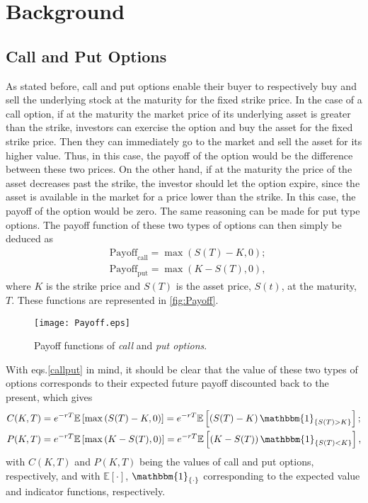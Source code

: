 \chapter{Background}
\label{chapter:background}
\section{Call and Put Options}
As stated before, call and put options enable their buyer to respectively buy and sell the underlying stock at the maturity for the fixed strike price.
In the case of a call option, if at the maturity the market price of its underlying asset is greater than the strike, investors can exercise the option and buy the asset for the fixed strike price. Then they can immediately go to the market and sell the asset for its higher value. Thus, in this case, the payoff of the option would be the difference between these two prices. On the other hand, if at the maturity the price of the asset decreases past the strike, the investor should let the option expire, since the asset is available in the market for a price lower than the strike. In this case, the payoff of the option would be zero.
The same reasoning can be made for put type options.
The payoff function of these two types of options can then simply be deduced as
\begin{equation}\label{callput}
\begin{split}
&\text{Payoff}_\text{call}=\max\left(S(T)-K,0\right);\\
&\text{Payoff}_\text{put}=\max\left(K-S(T),0\right),
\end{split}
\end{equation}
\noindent where $K$ is the strike price and $S(T)$ is the asset price, $S(t)$, at the maturity, $T$. These functions are represented in \autoref{fig:Payoff}.

\begin{figure}[!htb]
    \centering
      \texttt{[image: Payoff.eps]}
      \caption[Payoff functions of call and put options]{Payoff functions of \emph{call} and \emph{put options}.}\label{fig:Payoff}
    \end{figure}
    
With eqs.\eqref{callput} in mind, it should be clear that the value of these two types of options corresponds to their expected future payoff discounted back to the present, which gives
\begin{equation}
\begin{split}
&C(K,T)=e^{-rT}\mathbb{E}\left[\max\left(S(T)-K,0\right)\right]=e^{-rT}\mathbb{E}\left[\left(S(T)-K\right)\mathbbm{1}_{\left\{S(T)>K\right\}}\right];\\
&P(K,T)=e^{-rT}\mathbb{E}\left[\max\left(K-S(T),0\right)\right]=e^{-rT}\mathbb{E}\left[\left(K-S(T)\right)\mathbbm{1}_{\left\{S(T)<K\right\}}\right],
\end{split}
\end{equation}
\noindent with $C(K,T)$ and $P(K,T)$ being the values of call and put options, respectively, and with $\mathbb{E}[\cdot]$, $\mathbbm{1}_{\{\cdot\}}$ corresponding to the expected value and indicator functions, respectively.




